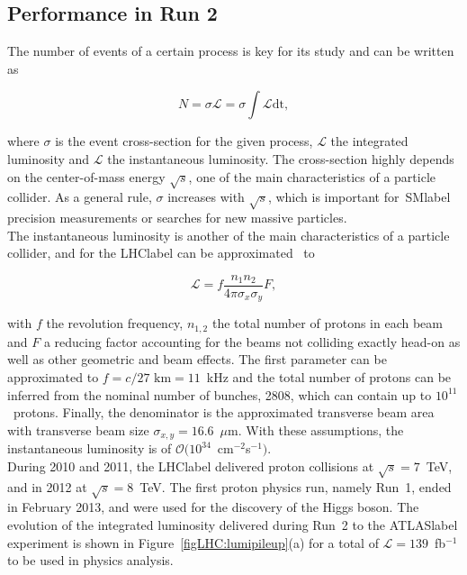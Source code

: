 \subsection{Performance in Run 2}

The number of events of a certain process is key for its study and can be written as

\begin{equation}
    N = \sigma\mathscr{L} = \sigma \int \mathcal{L} \text{dt},
\end{equation}

where $\sigma$ is the event cross-section for the given process, $\mathscr{L}$ the integrated luminosity and $\mathcal{L}$ the instantaneous luminosity. The cross-section highly depends on the center-of-mass energy $\sqrt{s}$, one of the main characteristics of a particle collider. As a general rule, $\sigma$ increases with $\sqrt{s}$, which is important for~\acrshort{SMlabel} precision measurements or searches for new massive particles.\\

The instantaneous luminosity is another of the main characteristics of a particle collider, and for the \acrshort{LHClabel} can be approximated~\cite{luminosity} to

\begin{equation}
    \mathcal{L} = f \frac{n_1n_2}{4\pi\sigma_x\sigma_y} F,
\end{equation}

with $f$ the revolution frequency, $n_{1,2}$ the total number of protons in each beam and $F$ a reducing factor accounting for the beams not colliding exactly head-on as well as other geometric and beam effects. The first parameter can be approximated to $f=c/27\text{ km} = 11$~kHz and the total number of protons can be inferred from the nominal number of bunches, 2808, which can contain up to $10^{11}$~protons. Finally, the denominator is the approximated transverse beam area with transverse beam size $\sigma_{x,y} = 16.6$~$\mu$m. With these assumptions, the instantaneous luminosity is of $\mathcal{O}(10^{34}$~cm$^{-2}$s$^{-1})$.\\

During 2010 and 2011, the \acrshort{LHClabel} delivered proton collisions at $\sqrt{s}=7$~TeV, and in 2012 at $\sqrt{s}=8$~TeV. The first proton physics run, namely Run~1, ended in February 2013, and were used for the discovery of the Higgs boson. The evolution of the integrated luminosity delivered during Run~2 to the \acrshort{ATLASlabel} experiment is shown in Figure~\ref{figLHC:lumipileup}(a) for a total of $\mathscr{L}=139$~fb$^{-1}$ to be used in physics analysis.\\

